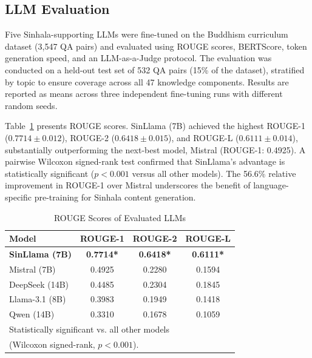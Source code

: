 \documentclass[conference]{IEEEtran}
\begin{document}
\subsection{LLM Evaluation}

Five Sinhala-supporting LLMs were fine-tuned on the Buddhism curriculum dataset (3,547 QA pairs) and evaluated using ROUGE scores, BERTScore, token generation speed, and an LLM-as-a-Judge protocol. The evaluation was conducted on a held-out test set of 532 QA pairs (15\% of the dataset), stratified by topic to ensure coverage across all 47 knowledge components. Results are reported as means across three independent fine-tuning runs with different random seeds.

Table~\ref{tab:rouge} presents ROUGE scores. SinLlama (7B) achieved the highest ROUGE-1 ($0.7714 \pm 0.012$), ROUGE-2 ($0.6418 \pm 0.015$), and ROUGE-L ($0.6111 \pm 0.014$), substantially outperforming the next-best model, Mistral (ROUGE-1: 0.4925). A pairwise Wilcoxon signed-rank test confirmed that SinLlama's advantage is statistically significant ($p < 0.001$ versus all other models). The 56.6\% relative improvement in ROUGE-1 over Mistral underscores the benefit of language-specific pre-training for Sinhala content generation.

\begin{table}[htbp]
\caption{ROUGE Scores of Evaluated LLMs}
\begin{center}
\begin{tabular}{|l|c|c|c|}
\hline
\textbf{Model} & \textbf{ROUGE-1} & \textbf{ROUGE-2} & \textbf{ROUGE-L} \\
\hline
\textbf{SinLlama (7B)} & \textbf{0.7714*} & \textbf{0.6418*} & \textbf{0.6111*} \\
\hline
Mistral (7B) & 0.4925 & 0.2280 & 0.1594 \\
\hline
DeepSeek (14B) & 0.4485 & 0.2304 & 0.1845 \\
\hline
Llama-3.1 (8B) & 0.3983 & 0.1949 & 0.1418 \\
\hline
Qwen (14B) & 0.3310 & 0.1678 & 0.1059 \\
\hline
\multicolumn{4}{l}{\footnotesize * Statistically significant vs. all other models} \\
\multicolumn{4}{l}{\footnotesize (Wilcoxon signed-rank, $p < 0.001$).} \\
\end{tabular}
\label{tab:rouge}
\end{center}
\end{table}
\end{document}
